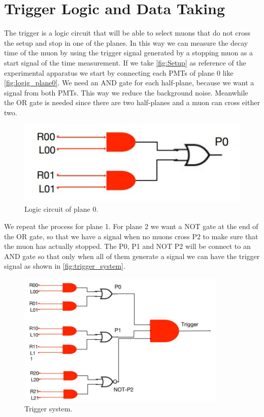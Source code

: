\chapter{Trigger Logic and Data Taking}
\label{sec:trigger}
The trigger is a logic circuit that will be able to select muons
that do not cross the setup and stop in one of the planes.
In this way we can measure the decay time of the muon by using the
trigger signal generated by a stopping muon as 
a start signal of the
time measurement.
If we take \autoref{fig:Setup} as reference of the experimental apparatus we start by
connecting each PMTs of plane 0 like \autoref{fig:logig_plane0}.
We need an AND gate for each half-plane, because we want a signal from both PMTs.
This way we reduce the background noise.
Meanwhile the OR gate is needed since there are two half-planes
and a muon can cross either two.\\
\begin{figure}[h]
\begin{center}
\includegraphics[width=80 mm,scale=0.5]{figures/Cattura2.png}
\end{center}
\caption{Logic circuit of plane 0.}
\label{fig:logig_plane0}
\end{figure}
We repeat the process for plane 1. For plane 2
we want a NOT gate at the end of the OR gate, so that we have a signal when no muons cross P2
to make sure that the muon has actually stopped. The P0, P1 and NOT P2 will be connect to an AND
gate so that only when all of them generate a signal we can have the trigger signal as
shown in \autoref{fig:trigger_system}.

\begin{figure}[h]
\begin{center}
\includegraphics[width=100mm]{figures/Cattura3.png}
\end{center}
\caption{Trigger system.}
\label{fig:trigger_system}
\end{figure}


